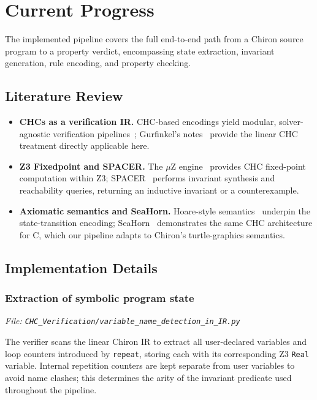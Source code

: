 \section*{Current Progress}
The implemented pipeline covers the full end-to-end path from a Chiron source program to a property verdict, encompassing state extraction, invariant generation, rule encoding, and property checking.

\subsection*{Literature Review}

\begin{itemize}[leftmargin=1.5em]
    \item \textbf{CHCs as a verification IR.} CHC-based encodings yield modular, solver-agnostic verification pipelines~\cite{bjorner2015horn, rybalchenko2011constraint}; Gurfinkel's notes~\cite{gurfinkel_chc_lecture} provide the linear CHC treatment directly applicable here.
    \item \textbf{Z3 Fixedpoint and SPACER.} The $\mu$Z engine~\cite{fixed-point-engine} provides CHC fixed-point computation within Z3; SPACER~\cite{z3guide_spacer} performs invariant synthesis and reachability queries, returning an inductive invariant or a counterexample.
    \item \textbf{Axiomatic semantics and SeaHorn.} Hoare-style semantics~\cite{utexas_axiomatic_semantics} underpin the state-transition encoding; SeaHorn~\cite{gurfinkel2015seahorn} demonstrates the same CHC architecture for C, which our pipeline adapts to Chiron's turtle-graphics semantics. 
\end{itemize}

\subsection*{Implementation Details}

\subsubsection*{Extraction of symbolic program state}
\noindent\textit{\small File: \texttt{CHC\_Verification/variable\_name\_detection\_in\_IR.py}}

The verifier scans the linear Chiron IR to extract all user-declared variables and loop counters introduced by \texttt{repeat}, storing each with its corresponding Z3 \texttt{Real} variable. Internal repetition counters are kept separate from user variables to avoid name clashes; this determines the arity of the invariant predicate used throughout the pipeline.

